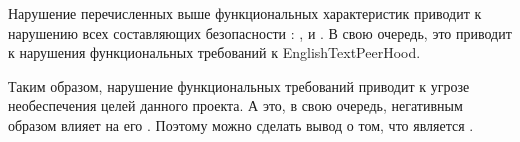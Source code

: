 %
Нарушение перечисленных выше функциональных характеристик приводит к нарушению всех составляющих безопасности : ,  и . В свою очередь, это приводит к  нарушения функциональных требований к EnglishText{PeerHood}.

%
Таким образом, нарушение функциональных требований  приводит к угрозе необеспечения целей данного проекта. 
%
А это, в свою очередь, негативным образом влияет на его . 
%
Поэтому можно сделать вывод о том, что  является  . 